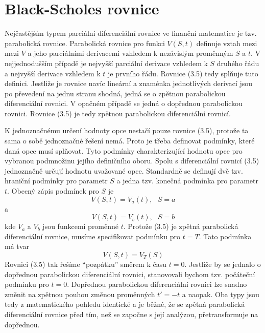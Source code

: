 \documentclass[a4paper]{book}
\begin{document}
\section{Black-Scholes rovnice}

Nejčastějším typem parciální diferenciální rovnice ve finanční matematice je tzv. parabolická rovnice. Parabolická rovnice pro funkci $V(S,t)$ definuje vztah mezi mezi $V$ a jeho parciálními derivacemi vzhledem k nezávislým proměnným $S$ a $t$. V nejjednodušším případě je nejvyšší parciální derivace vzhledem k $S$ druhého řádu a nejvyšší derivace vzhledem k $t$ je prvního řádu. Rovnice (3.5) tedy splňuje tuto definici. Jestliže je rovnice navíc lineární a znaménka jednotlivých derivací jsou po převedení na jednu stranu shodná, jedná se o zpětnou parabolickou diferenciální rovnici. V opačném případě se jedná o dopřednou parabolickou rovnici. Rovnice (3.5) je tedy zpětnou parabolickou diferenciální rovnicí.

K jednoznačnému určení hodnoty opce nestačí pouze rovnice (3.5), protože ta sama o sobě jednoznačné řešení nemá. Proto je třeba definovat podmínky, které daná opce musí splňovat. Tyto podmínky charakterizující hodnotu opce pro vybranou podmnožinu jejího definičního oboru. Spolu s diferenciální rovnicí (3.5) jednoznačně určují hodnotu uvažované opce. Standardně se definují dvě tzv. hraniční podmínky pro parametr $S$ a jedna tzv. konečná podmínka pro parametr $t$. Obecný zápis podmínek pro $S$ je
\begin{equation*} 
V(S,t)=V_a(t), ~~~ S = a
\end{equation*}
a
\begin{equation*} 
V(S,t)=V_b(t), ~~~ S = b
\end{equation*}
kde $V_a$ a $V_b$ jsou funkcemi proměnné $t$. Protože (3.5) je zpětná parabolická diferenciální rovnice, musíme specifikovat podmínku pro $t = T$. Tato podmínka má tvar
\begin{equation*}
V(S,t)= V_T(S)
\end{equation*}
Rovnici (3.5) tak řešíme ``pozpátku'' směrem k času $t = 0$. Jestliže by se jednalo o dopřednou parabolickou diferenciální rovnici, stanovovali bychom tzv. počáteční podmínku pro $t = 0$. Dopřednou parabolickou diferenciální rovnici lze snadno změnit na zpětnou pouhou změnou proměnných $t' = -t$ a naopak. Oba typy jsou tedy z matematického pohledu identické a je běžné, že se zpětná parabolická diferenciální rovnice před tím, než se započne s její analýzou, přetransformuje na dopřednou.
\end{document}
